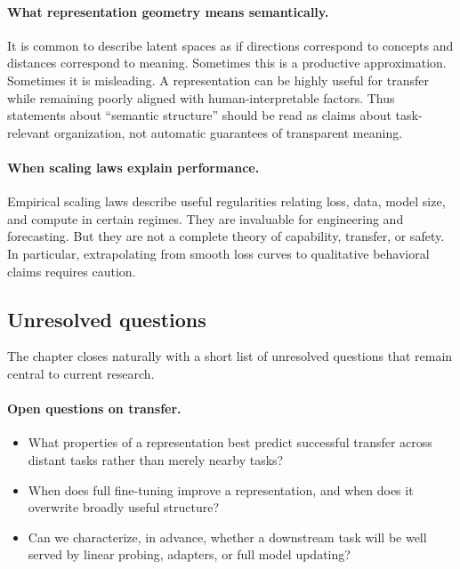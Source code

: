 \paragraph{What representation geometry means semantically.}
It is common to describe latent spaces as if directions correspond to concepts and distances correspond to meaning. Sometimes this is a productive approximation. Sometimes it is misleading. A representation can be highly useful for transfer while remaining poorly aligned with human-interpretable factors. Thus statements about ``semantic structure'' should be read as claims about task-relevant organization, not automatic guarantees of transparent meaning.

\paragraph{When scaling laws explain performance.}
Empirical scaling laws describe useful regularities relating loss, data, model size, and compute in certain regimes. They are invaluable for engineering and forecasting. But they are not a complete theory of capability, transfer, or safety. In particular, extrapolating from smooth loss curves to qualitative behavioral claims requires caution.

\subsection*{Unresolved questions}

The chapter closes naturally with a short list of unresolved questions that remain central to current research.

\paragraph{Open questions on transfer.}
\begin{itemize}
    \item What properties of a representation best predict successful transfer across distant tasks rather than merely nearby tasks?
    \item When does full fine-tuning improve a representation, and when does it overwrite broadly useful structure?
    \item Can we characterize, in advance, whether a downstream task will be well served by linear probing, adapters, or full model updating?
\end{itemize}

